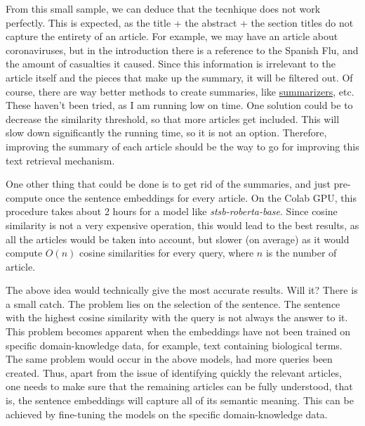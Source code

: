 \documentclass[12pt]{report}
\begin{document}
\noindent From this small sample, we can deduce that the 
tecnhique does not work perfectly. This is expected, as the title + the
abstract + the section titles do not capture the entirety of an article. For example,
we may have an article about coronaviruses, but in the introduction there is a reference
to the Spanish Flu, and the amount of casualties it caused. Since this information is
irrelevant to the article itself and the pieces that make up the summary, it will be
filtered out. Of course, there are way better methods to create summaries, like
\href{https://huggingface.co/transformers/task_summary.html#summarization}{summarizers},
etc. These haven't been tried, as I am running low on time. One solution could be to
decrease the similarity threshold, so that more articles get included. This will slow down
significantly the running time, so it is not an option. Therefore, improving
the summary of each article should be the way to go for improving this text retrieval
mechanism. \bigskip

\noindent One other thing that could be done is to get rid of the summaries, and just
pre-compute once the sentence embeddings for every article. On the Colab GPU, this
procedure takes about 2 hours for a model like \textit{stsb-roberta-base}. Since
cosine similarity is not a very expensive operation, this would lead to the best results,
as all the articles would be taken into account, but slower (on average) as it would
compute $O(n)$ cosine similarities for every query, where $n$ is the number of article.
\bigskip

\noindent The above idea would technically give the most accurate results. Will it?
There is a small catch. The problem lies on the selection of the 
sentence. The sentence with the highest cosine similarity with the query is not always
the answer to it. This problem becomes apparent when the embeddings have not been
trained on specific domain-knowledge data, for example, text containing biological terms.
The same problem would occur in the above models, had more queries been created.
Thus, apart from the issue of identifying quickly the relevant articles, one needs
to make sure that the remaining articles can be fully understood, that is, the
sentence embeddings will capture all of its semantic meaning. This can be achieved
by fine-tuning the models on the specific domain-knowledge data.
\end{document}
